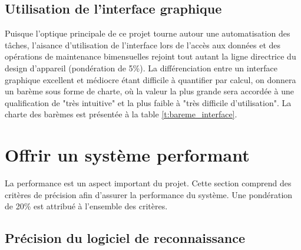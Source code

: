 \subsection{Utilisation de l'interface graphique}

\begin{table}[htb!]
   \footnotesize
   \centering
   \caption{Évaluation du barème de l'interface graphique}
   \label{t:bareme_interface}
\end{table}

Puisque l'optique principale de ce projet tourne autour une automatisation des tâches, l'aisance d'utilisation de l'interface lors de l'accès aux données et des opérations de maintenance bimensuelles rejoint tout autant la ligne directrice du design d'appareil (pondération de 5\%). La différenciation entre un interface graphique excellent et médiocre étant difficile à quantifier par calcul, on donnera un barème sous forme de charte, où la valeur la plus grande sera accordée à une qualification de "très intuitive" et la plus faible à "très difficile d'utilisation". La charte des barèmes est présentée à la table \ref{t:bareme_interface}. 


\section{Offrir un système performant}
La performance est un aspect important du projet. Cette section comprend des critères de précision afin d'assurer la performance du système. Une pondération de 20\% est attribué à l'ensemble des critères.

\subsection{Précision du logiciel de reconnaissance}

